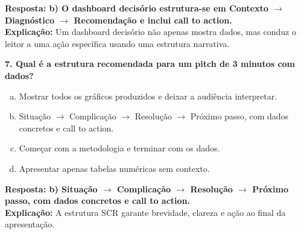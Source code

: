 \begin{SolvedBox}[orange]
\textbf{Resposta: b) O dashboard decisório estrutura-se em Contexto $\rightarrow$ Diagnóstico $\rightarrow$ Recomendação e inclui call to action.} \\
\textbf{Explicação:} Um dashboard decisório não apenas mostra dados, mas conduz o leitor a uma ação específica usando uma estrutura narrativa.

\textbf{7. Qual é a estrutura recomendada para um pitch de 3 minutos com dados?}

\begin{enumerate}[a)]
  \item Mostrar todos os gráficos produzidos e deixar a audiência interpretar.
  \item Situação $\rightarrow$ Complicação $\rightarrow$ Resolução $\rightarrow$ Próximo passo, com dados concretos e call to action.
  \item Começar com a metodologia e terminar com os dados.
  \item Apresentar apenas tabelas numéricas sem contexto.
\end{enumerate}

\textbf{Resposta: b) Situação $\rightarrow$ Complicação $\rightarrow$ Resolução $\rightarrow$ Próximo passo, com dados concretos e call to action.} \\
\textbf{Explicação:} A estrutura SCR garante brevidade, clareza e ação ao final da apresentação.
\end{SolvedBox}

